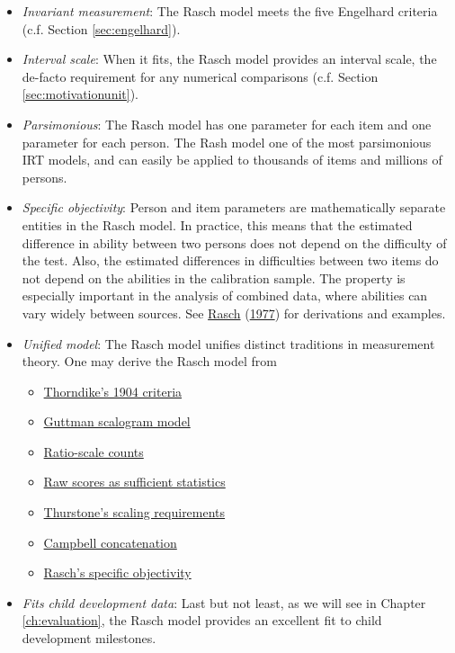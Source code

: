 \documentclass[
]{book}
\providecommand{\tightlist}{%
  \setlength{\itemsep}{0pt}\setlength{\parskip}{0pt}}
\begin{document}
\begin{itemize}
\item
  \emph{Invariant measurement}: The Rasch model meets the five Engelhard criteria (c.f. Section \ref{sec:engelhard}).
\item
  \emph{Interval scale}: When it fits, the Rasch model provides an interval scale, the de-facto requirement for any numerical comparisons (c.f. Section \ref{sec:motivationunit}).
\item
  \emph{Parsimonious}: The Rasch model has one parameter for each item and one parameter for each person. The Rash model one of the most parsimonious IRT models, and can easily be applied to thousands of items and millions of persons.
\item
  \emph{Specific objectivity}: Person and item parameters are mathematically separate entities in the Rasch model. In practice, this means that the estimated difference in ability between two persons does not depend on the difficulty of the test. Also, the estimated differences in difficulties between two items do not depend on the abilities in the calibration sample. The property is especially important in the analysis of combined data, where abilities can vary widely between sources. See \protect\hyperlink{ref-rasch1977}{Rasch} (\protect\hyperlink{ref-rasch1977}{1977}) for derivations and examples.
\item
  \emph{Unified model}: The Rasch model unifies distinct traditions in measurement theory. One may derive the Rasch model from

  \begin{itemize}
  \tightlist
  \item
    \href{https://www.rasch.org/rmt/rmt143g.htm}{Thorndike's 1904 criteria}
  \item
    \href{https://www.rasch.org/rmt/rmt63e.htm}{Guttman scalogram model}
  \item
    \href{https://www.rasch.org/rmt/rmt62c.htm}{Ratio-scale counts}
  \item
    \href{https://www.rasch.org/rmt/rmt32e.htm}{Raw scores as sufficient statistics}
  \item
    \href{https://www.rasch.org/rmt/rmt21a.htm}{Thurstone's scaling requirements}
  \item
    \href{https://www.rasch.org/rmt/rmt21b.htm}{Campbell concatenation}
  \item
    \href{https://www.rasch.org/rmt/rmt11a.htm}{Rasch's specific objectivity}
  \end{itemize}
\item
  \emph{Fits child development data}: Last but not least, as we will see in Chapter \ref{ch:evaluation}, the Rasch model provides an excellent fit to child development milestones.
\end{itemize}
\end{document}
